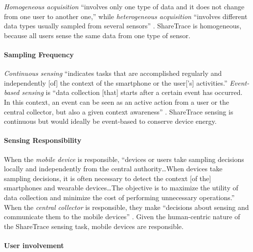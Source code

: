 \emph{Homogeneous acquisition} ``involves only one type of data and it does not change from one user to another one,'' while \emph{heterogeneous acquisition} ``involves different data types usually sampled from several sensors'' \citep{Capponi2019}. ShareTrace is homogeneous, because all users sense the same data from one type of sensor.

\paragraph{Sampling Frequency}

\emph{Continuous sensing} ``indicates tasks that are accomplished regularly and independently [of] the context of the smartphone or the user['s] activities.'' \emph{Event-based sensing} is ``data collection [that] starts after a certain event has occurred. In this context, an event can be seen as an active action from a user or the central collector, but also a given context awareness'' \citep{Capponi2019}. ShareTrace sensing is continuous but would ideally be event-based to conserve device energy.

\paragraph{Sensing Responsibility}

When the \emph{mobile device} is responsible, ``devices or users take sampling decisions locally and independently from the central authority{\ldots}When devices take sampling decisions, it is often necessary to detect the context [of the] smartphones and wearable devices{\ldots}The objective is to maximize the utility of data collection and minimize the cost of performing unnecessary operations.'' When the \emph{central collector} is responsible, they make ``decisions about sensing and communicate them to the mobile devices'' \citep{Capponi2019}. Given the human-centric nature of the ShareTrace sensing task, mobile devices are responsible.

\paragraph{User involvement}

